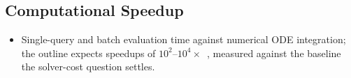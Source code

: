\subsection{Computational Speedup}
\label{sec:speedup}

\begin{itemize}
  \item Single-query and batch evaluation time against numerical ODE integration; the outline expects speedups of $10^2$--$10^4\times$~\citep{Liodis2024,Kaushikk2026,Reed2024}, measured against the baseline the solver-cost question settles.
\end{itemize}
